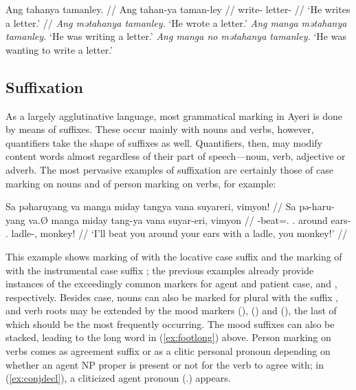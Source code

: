 \pex
	\a\begingl
		\gla Ang tahanya tamanley. //
		\glb Ang tahan-ya taman-ley //
		\glc \AgtT{} write-\TsgM{} letter-\PargI{} //
		\glft `He writes a letter.' //
	\endgl
	\a \textit{Ang mətahanya tamanley.} `He wrote a letter.'
	\a \textit{Ang manga mətahanya tamanley.} `He was writing a letter.'
	\a \textit{Ang manga no mətahanya tamanley.} `He was wanting to write a 
		letter.'
\xe

\subsection{Suffixation}

As a largely agglutinative language, most grammatical marking in Ayeri is done 
by means of suffixes. These occur mainly with nouns and verbs, however, 
quantifiers take the shape of suffixes as well. Quantifiers, then, may modify 
content words almost regardless of their part of speech---noun, verb, adjective 
or adverb. The most pervasive examples of suffixation are certainly those of 
case marking on nouns and of person marking on verbs, for example:

\ex\label{ex:conjdecl}\begingl
	\gla Sa pəharuyang va manga miday tangya vana suyareri, vimyon! //
	\glb Sa pə-haru-yang va.Ø manga miday tang-ya vana suyar-eri, vimyon //
	\glc \PatT{} \NFut{}-beat=\Fsg{}.\Aarg{} \Ssg{}.\Top{} \Dyn{} around 
		ears-\Loc{} \Ssg{}.\Gen{} ladle-\Ins{}, monkey! //
	\glft `I'll beat you around your ears with a ladle, you monkey!' //
\endgl\xe

This example shows marking of  with the locative case 
suffix  and the marking of  with the 
instrumental case suffix ; the previous examples already 
provide instances of the exceedingly common markers for agent and patient 
case,  and , respectively. Besides case, nouns 
can also be marked for plural with the suffix , and verb roots 
may be extended by the mood markers  (\Irr{}), 
 (\Hab{}) and  (\Neg{}), the last of which should 
be the most frequently occurring. The mood suffixes can also be stacked, leading 
to the long word in (\ref{ex:footlong}) above. Person marking on verbs comes as 
agreement suffix or as a clitic personal pronoun depending on whether an agent 
NP proper is present or not for the verb to agree with; in (\ref{ex:conjdecl}), 
a cliticized agent pronoun  (\TsgM{}.\Aarg{}) appears.

